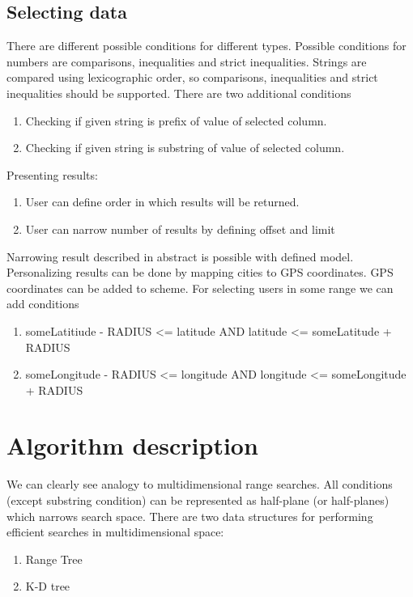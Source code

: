 \documentclass[10pt,a4paper]{article}
\begin{document}
\subsection{Selecting data}
There are different possible conditions for different types. Possible conditions for numbers are comparisons, inequalities and strict inequalities. Strings are compared using lexicographic order, so comparisons, inequalities and strict inequalities should be supported. There are two additional conditions
\begin{enumerate}
\item Checking if given string is prefix of value of selected column. 
\item Checking if given string is substring of value of selected column. 
\end{enumerate}
Presenting results:
\begin{enumerate}
\item User can define order in which results will be returned.
\item User can narrow number of results by defining offset and 
limit
\end{enumerate}

Narrowing result described in abstract is possible with defined model. Personalizing results can be done by mapping cities to GPS coordinates. GPS coordinates can be added to scheme. For selecting users in some range we can add conditions   
\begin{enumerate}
\item someLatitiude - RADIUS <= latitude AND latitude <= someLatitude + RADIUS
\item someLongitude - RADIUS <= longitude AND longitude <= someLongitude + RADIUS
\end{enumerate}

\section{Algorithm description}
We can clearly see analogy to multidimensional range searches. All conditions (except substring condition) can be represented as half-plane (or half-planes) which narrows search space. There are two data structures for performing efficient searches in multidimensional space:

\begin{enumerate}
\item Range Tree \cite{CGAAA}
\item K-D tree \cite{CGAAA}
\end{enumerate}
\end{document}
